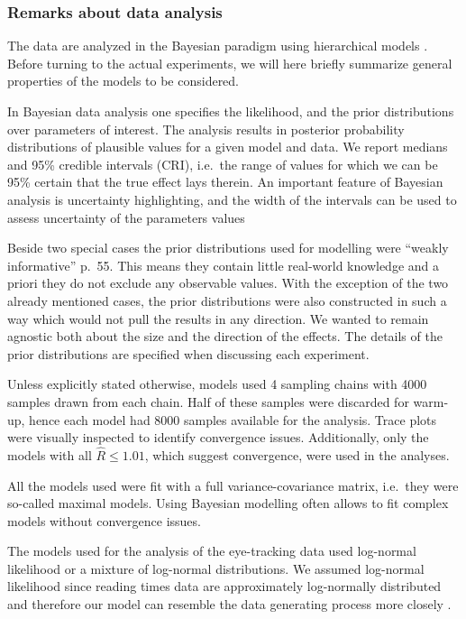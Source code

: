 \hypertarget{remarks-about-data-analysis}{%
\subsubsection{Remarks about data
analysis}\label{remarks-about-data-analysis}}

The data are analyzed in the Bayesian paradigm using hierarchical models
\autocite{gelman2003bda,gelman2006data,mcelreath2018statistical,nicenboim2021introd_bayes_data}.
Before turning to the actual experiments, we will here briefly summarize
general properties of the models to be considered.

In Bayesian data analysis one specifies the likelihood, and the prior
distributions over parameters of interest. The analysis results in
posterior probability distributions of plausible values for a given
model and data. We report medians and 95\% credible intervals (CRI),
i.e.~the range of values for which we can be 95\% certain that the true
effect lays therein. An important feature of Bayesian analysis is
uncertainty highlighting, and the width of the intervals can be used to
assess uncertainty of the parameters values

Beside two special cases the prior distributions used for modelling were
``weakly informative'' \autocite{gelman2003bda} p.~55. This means they
contain little real-world knowledge and a priori they do not exclude any
observable values. With the exception of the two already mentioned
cases, the prior distributions were also constructed in such a way which
would not pull the results in any direction. We wanted to remain
agnostic both about the size and the direction of the effects. The
details of the prior distributions are specified when discussing each
experiment.

Unless explicitly stated otherwise, models used 4 sampling chains with
4000 samples drawn from each chain. Half of these samples were discarded
for warm-up, hence each model had 8000 samples available for the
analysis. Trace plots were visually inspected to identify convergence
issues. Additionally, only the models with all \(\hat{R} \leq 1.01\),
which suggest convergence, were used in the analyses.

All the models used were fit with a full variance-covariance matrix,
i.e.~they were so-called maximal models. Using Bayesian modelling often
allows to fit complex models without convergence issues.

The models used for the analysis of the eye-tracking data used
log-normal likelihood or a mixture of log-normal distributions. We
assumed log-normal likelihood since reading times data are approximately
log-normally distributed and therefore our model can resemble the data
generating process more closely \autocites[see][ for a more detailed
discussion]{rouder2008hierarchical,Nicenboim_2016,nicenboim2018explor_confir}.

